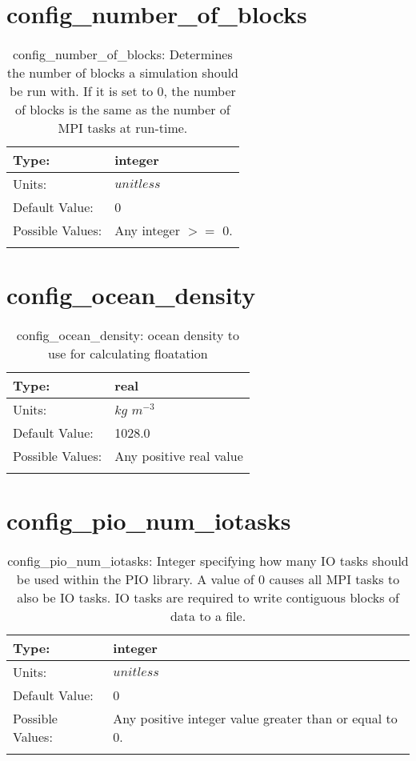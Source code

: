 \section[config\_number\_of\_blocks]{config\_number\_of\_blocks}
\label{sec:nm_sec_config_number_of_blocks}
\begin{center}
\begin{longtable}{| p{2.0in} || p{4.0in} |}
    \hline
    Type: & integer \\
    \hline
    Units: & $unitless$ \\
    \hline
    Default Value: & 0 \\
    \hline
    Possible Values: & Any integer $>=$ 0. \\
    \hline
    \caption{config\_number\_of\_blocks: Determines the number of blocks a simulation should be run with. If it is set to 0, the number of blocks is the same as the number of MPI tasks at run-time.}
\end{longtable}
\end{center}
\section[config\_ocean\_density]{config\_ocean\_density}
\label{sec:nm_sec_config_ocean_density}
\begin{center}
\begin{longtable}{| p{2.0in} || p{4.0in} |}
    \hline
    Type: & real \\
    \hline
    Units: & $kg$ $m^{-3}$ \\
    \hline
    Default Value: & 1028.0 \\
    \hline
    Possible Values: & Any positive real value \\
    \hline
    \caption{config\_ocean\_density: ocean density to use for calculating floatation}
\end{longtable}
\end{center}
\section[config\_pio\_num\_iotasks]{config\_pio\_num\_iotasks}
\label{sec:nm_sec_config_pio_num_iotasks}
\begin{center}
\begin{longtable}{| p{2.0in} || p{4.0in} |}
    \hline
    Type: & integer \\
    \hline
    Units: & $unitless$ \\
    \hline
    Default Value: & 0 \\
    \hline
    Possible Values: & Any positive integer value greater than or equal to 0. \\
    \hline
    \caption{config\_pio\_num\_iotasks: Integer specifying how many IO tasks should be used within the PIO library. A value of 0 causes all MPI tasks to also be IO tasks. IO tasks are required to write contiguous blocks of data to a file.}
\end{longtable}
\end{center}
